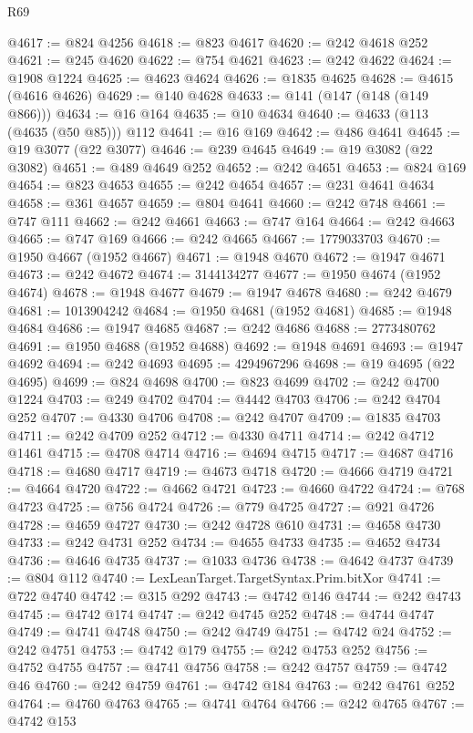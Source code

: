 \begin{lexlean}{R69}
\begin{coremodule}
{@4617 := @824 @4256
@4618 := @823 @4617
@4620 := @242 @4618 @252
@4621 := @245 @4620
@4622 := @754 @4621
@4623 := @242 @4622
@4624 := @1908 @1224
@4625 := @4623 @4624
@4626 := @1835 @4625
@4628 := @4615 (@4616 @4626)
@4629 := @140 @4628
@4633 := @141 (@147 (@148 (@149 @866)))
@4634 := @16 @164
@4635 := @10 @4634
@4640 := @4633 (@113 (@4635 (@50 @85))) @112
@4641 := @16 @169
@4642 := @486 @4641
@4645 := @19 @3077 (@22 @3077)
@4646 := @239 @4645
@4649 := @19 @3082 (@22 @3082)
@4651 := @489 @4649 @252
@4652 := @242 @4651
@4653 := @824 @169
@4654 := @823 @4653
@4655 := @242 @4654
@4657 := @231 @4641 @4634
@4658 := @361 @4657
@4659 := @804 @4641
@4660 := @242 @748
@4661 := @747 @111
@4662 := @242 @4661
@4663 := @747 @164
@4664 := @242 @4663
@4665 := @747 @169
@4666 := @242 @4665
@4667 := 1779033703
@4670 := @1950 @4667 (@1952 @4667)
@4671 := @1948 @4670
@4672 := @1947 @4671
@4673 := @242 @4672
@4674 := 3144134277
@4677 := @1950 @4674 (@1952 @4674)
@4678 := @1948 @4677
@4679 := @1947 @4678
@4680 := @242 @4679
@4681 := 1013904242
@4684 := @1950 @4681 (@1952 @4681)
@4685 := @1948 @4684
@4686 := @1947 @4685
@4687 := @242 @4686
@4688 := 2773480762
@4691 := @1950 @4688 (@1952 @4688)
@4692 := @1948 @4691
@4693 := @1947 @4692
@4694 := @242 @4693
@4695 := 4294967296
@4698 := @19 @4695 (@22 @4695)
@4699 := @824 @4698
@4700 := @823 @4699
@4702 := @242 @4700 @1224
@4703 := @249 @4702
@4704 := @4442 @4703
@4706 := @242 @4704 @252
@4707 := @4330 @4706
@4708 := @242 @4707
@4709 := @1835 @4703
@4711 := @242 @4709 @252
@4712 := @4330 @4711
@4714 := @242 @4712 @1461
@4715 := @4708 @4714
@4716 := @4694 @4715
@4717 := @4687 @4716
@4718 := @4680 @4717
@4719 := @4673 @4718
@4720 := @4666 @4719
@4721 := @4664 @4720
@4722 := @4662 @4721
@4723 := @4660 @4722
@4724 := @768 @4723
@4725 := @756 @4724
@4726 := @779 @4725
@4727 := @921 @4726
@4728 := @4659 @4727
@4730 := @242 @4728 @610
@4731 := @4658 @4730
@4733 := @242 @4731 @252
@4734 := @4655 @4733
@4735 := @4652 @4734
@4736 := @4646 @4735
@4737 := @1033 @4736
@4738 := @4642 @4737
@4739 := @804 @112
@4740 := LexLeanTarget.TargetSyntax.Prim.bitXor
@4741 := @722 @4740
@4742 := @315 @292
@4743 := @4742 @146
@4744 := @242 @4743
@4745 := @4742 @174
@4747 := @242 @4745 @252
@4748 := @4744 @4747
@4749 := @4741 @4748
@4750 := @242 @4749
@4751 := @4742 @24
@4752 := @242 @4751
@4753 := @4742 @179
@4755 := @242 @4753 @252
@4756 := @4752 @4755
@4757 := @4741 @4756
@4758 := @242 @4757
@4759 := @4742 @46
@4760 := @242 @4759
@4761 := @4742 @184
@4763 := @242 @4761 @252
@4764 := @4760 @4763
@4765 := @4741 @4764
@4766 := @242 @4765
@4767 := @4742 @153
}
\end{coremodule}
\end{lexlean}
